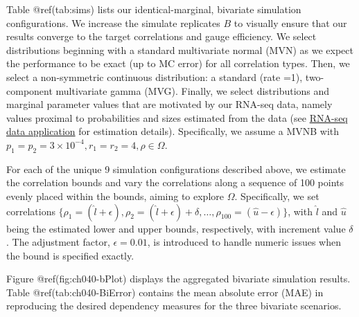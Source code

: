 \documentclass[
]{jss}
\begin{document}
Table @ref(tab:sims) lists our identical-marginal, bivariate simulation
configurations. We increase the simulate replicates \(B\) to visually
ensure that our results converge to the target correlations and gauge
efficiency. We select distributions beginning with a standard
multivariate normal (MVN) as we expect the performance to be exact (up
to MC error) for all correlation types. Then, we select a non-symmetric
continuous distribution: a standard (rate =1), two-component
multivariate gamma (MVG). Finally, we select distributions and marginal
parameter values that are motivated by our RNA-seq data, namely values
proximal to probabilities and sizes estimated from the data (see
\href{examples}{RNA-seq data application} for estimation details).
Specifically, we assume a MVNB with
\(p_1 = p_2 = 3\times10^{-4}, r_1 = r_2 = 4, \rho \in \Omega\).

For each of the unique 9 simulation configurations described above, we
estimate the correlation bounds and vary the correlations along a
sequence of 100 points evenly placed within the bounds, aiming to
explore \(\Omega\). Specifically, we set correlations
\(\{ \rho_1 = ( \hat{l} + \epsilon), \rho_2 = (\hat{l} + \epsilon) + \delta, \ldots, \rho_{100} = (\hat{u} - \epsilon) \}\),
with \(\hat{l}\) and \(\hat{u}\) being the estimated lower and upper
bounds, respectively, with increment value \(\delta\). The adjustment
factor, \(\epsilon=0.01\), is introduced to handle numeric issues when
the bound is specified exactly.

Figure @ref(fig:ch040-bPlot) displays the aggregated bivariate
simulation results. Table @ref(tab:ch040-BiError) contains the mean
absolute error (MAE) in reproducing the desired dependency measures for
the three bivariate scenarios.
\end{document}
